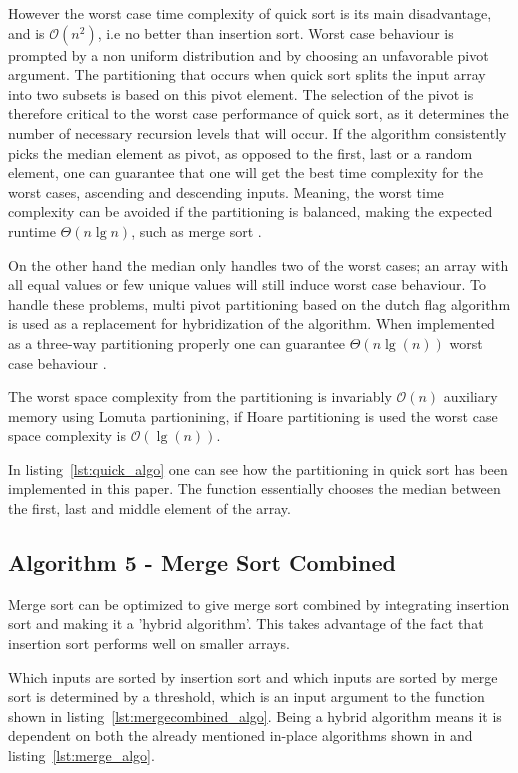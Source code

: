 \documentclass[sigconf, nonacm, natbib, screen, balance=False]{acmart}
\begin{document}
However the worst case time complexity of quick sort is its main disadvantage, and is $\mathcal{O}(n^2)$, i.e no better than insertion sort. Worst case behaviour is prompted by a non uniform distribution and by choosing an unfavorable pivot argument. The partitioning that occurs when quick sort splits the input array into two subsets is based on this pivot element. The selection of the pivot is therefore critical to the worst case performance of quick sort, as it determines the number of necessary recursion levels that will occur. If the algorithm consistently picks the median element as pivot, as opposed to the first, last or a random element, one can guarantee that one will get the best time complexity for the worst cases, ascending and descending inputs. Meaning, the worst time complexity can be avoided if the partitioning is balanced, making the expected runtime $\Theta(n\lg n)$, such as merge sort \cite{SortingA29:online}. 

On the other hand the median only handles two of the worst cases; an array with all equal values or few unique values will still induce worst case behaviour. To handle these problems, multi pivot partitioning based on the dutch flag algorithm is used as a replacement for hybridization of the algorithm. When implemented as a three-way partitioning properly one can guarantee $\Theta(n\lg(n))$ worst case behaviour \cite{Quicksor66:online}.

The worst space complexity from the partitioning is invariably $\mathcal{O}(n)$ \cite{Microsof28:online} auxiliary memory using Lomuta partionining, if Hoare partitioning is used the worst case space complexity is $\mathcal{O}(\lg (n))$.

In listing~\ref{lst:quick_algo} one can see how the partitioning in quick sort has been implemented in this paper. The  function essentially chooses the median between the first, last and middle element of the array.

\subsection{Algorithm 5 - Merge Sort Combined}\label{sec:algo5}

Merge sort can be optimized to give merge sort combined by integrating insertion sort and making it a 'hybrid algorithm'. This takes advantage of the fact that insertion sort performs well on smaller arrays. 

Which inputs are sorted by insertion sort and which inputs are sorted by merge sort is determined by a threshold, which is an input argument to the function shown in listing~\ref{lst:mergecombined_algo}. Being a hybrid algorithm means it is dependent on both the already mentioned in-place algorithms shown in \citet[Ch.~2.1]{CLRS_2009} and listing~\ref{lst:merge_algo}.
\end{document}
